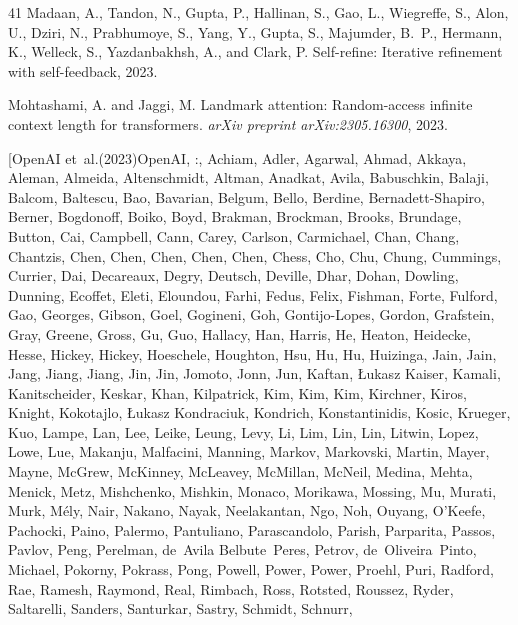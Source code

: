 \documentclass{article}
\theoremstyle{plain}
\theoremstyle{definition}
\theoremstyle{remark}
\begin{document}
\begin{thebibliography}{41}
Madaan, A., Tandon, N., Gupta, P., Hallinan, S., Gao, L., Wiegreffe, S., Alon,
  U., Dziri, N., Prabhumoye, S., Yang, Y., Gupta, S., Majumder, B.~P., Hermann,
  K., Welleck, S., Yazdanbakhsh, A., and Clark, P.
\newblock Self-refine: Iterative refinement with self-feedback, 2023.

Mohtashami, A. and Jaggi, M.
\newblock Landmark attention: Random-access infinite context length for
  transformers.
\newblock \emph{arXiv preprint arXiv:2305.16300}, 2023.

\bibitem[OpenAI et~al.(2023)OpenAI, :, Achiam, Adler, Agarwal, Ahmad, Akkaya,
  Aleman, Almeida, Altenschmidt, Altman, Anadkat, Avila, Babuschkin, Balaji,
  Balcom, Baltescu, Bao, Bavarian, Belgum, Bello, Berdine, Bernadett-Shapiro,
  Berner, Bogdonoff, Boiko, Boyd, Brakman, Brockman, Brooks, Brundage, Button,
  Cai, Campbell, Cann, Carey, Carlson, Carmichael, Chan, Chang, Chantzis, Chen,
  Chen, Chen, Chen, Chen, Chess, Cho, Chu, Chung, Cummings, Currier, Dai,
  Decareaux, Degry, Deutsch, Deville, Dhar, Dohan, Dowling, Dunning, Ecoffet,
  Eleti, Eloundou, Farhi, Fedus, Felix, Fishman, Forte, Fulford, Gao, Georges,
  Gibson, Goel, Gogineni, Goh, Gontijo-Lopes, Gordon, Grafstein, Gray, Greene,
  Gross, Gu, Guo, Hallacy, Han, Harris, He, Heaton, Heidecke, Hesse, Hickey,
  Hickey, Hoeschele, Houghton, Hsu, Hu, Hu, Huizinga, Jain, Jain, Jang, Jiang,
  Jiang, Jin, Jin, Jomoto, Jonn, Jun, Kaftan, Łukasz Kaiser, Kamali,
  Kanitscheider, Keskar, Khan, Kilpatrick, Kim, Kim, Kim, Kirchner, Kiros,
  Knight, Kokotajlo, Łukasz Kondraciuk, Kondrich, Konstantinidis, Kosic,
  Krueger, Kuo, Lampe, Lan, Lee, Leike, Leung, Levy, Li, Lim, Lin, Lin, Litwin,
  Lopez, Lowe, Lue, Makanju, Malfacini, Manning, Markov, Markovski, Martin,
  Mayer, Mayne, McGrew, McKinney, McLeavey, McMillan, McNeil, Medina, Mehta,
  Menick, Metz, Mishchenko, Mishkin, Monaco, Morikawa, Mossing, Mu, Murati,
  Murk, Mély, Nair, Nakano, Nayak, Neelakantan, Ngo, Noh, Ouyang, O'Keefe,
  Pachocki, Paino, Palermo, Pantuliano, Parascandolo, Parish, Parparita,
  Passos, Pavlov, Peng, Perelman, de~Avila Belbute~Peres, Petrov,
  de~Oliveira~Pinto, Michael, Pokorny, Pokrass, Pong, Powell, Power, Power,
  Proehl, Puri, Radford, Rae, Ramesh, Raymond, Real, Rimbach, Ross, Rotsted,
  Roussez, Ryder, Saltarelli, Sanders, Santurkar, Sastry, Schmidt, Schnurr,

\end{thebibliography}
\end{document}
